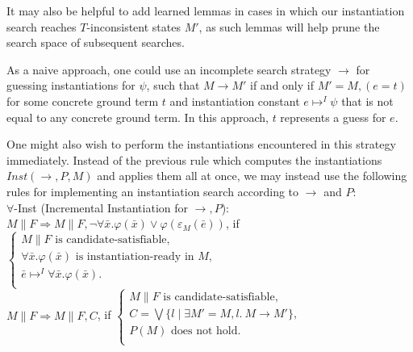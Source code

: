 \documentclass{llncs}
\begin{document}
It may also be helpful to add learned lemmas in cases in which our instantiation search reaches $T$-inconsistent states $M'$, as such lemmas will help prune the search space of subsequent searches.

As a naive approach, one could use an incomplete search strategy $\rightarrow$ for guessing instantiations for $\psi$, such that $M \rightarrow M'$ if and only if $M' = M, (e = t)$ for some concrete ground term $t$ and instantiation constant $e \mapsto^I \psi$ that is not equal to any concrete ground term.
In this approach, $t$ represents a guess for $e$.


One might also wish to perform the instantiations encountered in this strategy immediately.
Instead of the previous rule which computes the instantiations $Inst( \rightarrow, P, M )$ and applies them all at once, we may instead use the following rules for implementing an instantiation search according to $\rightarrow$ and $P$: \\

\noindent $\forall$-Inst (Incremental Instantiation for $\rightarrow,P$): \\

$M \parallel F \Longrightarrow M \parallel F, \neg \forall \bar{x}. \varphi( \bar{ x } ) \vee \varphi( \varepsilon_M( \bar{ e } ) )$, if   
$\begin{cases}
  M \parallel F \text{ is candidate-satisfiable}, \\
  \forall \bar{x}. \varphi( \bar{ x } ) \text{ is instantiation-ready in $M$}, \\
  \bar{e} \mapsto^I \forall \bar{x}. \varphi( \bar{ x } ). \\
\end{cases}$ \\

$M \parallel F \Longrightarrow M \parallel F, C$, if   
$\begin{cases}
  M \parallel F \text{ is candidate-satisfiable}, \\
  C = \bigvee \{ l \mid \exists M' = M, l. \ M \rightarrow M' \}, \\ 
  P( M ) \text{ does not hold}. \\
\end{cases}$ \\
\end{document}
